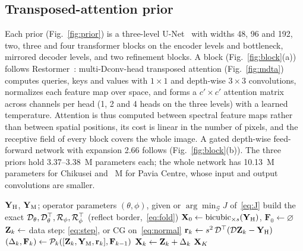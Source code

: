 \documentclass[journal]{IEEEtran}
\begin{document}
\subsection{Transposed-attention prior}
Each prior (Fig.~\ref{fig:prior}) is a three-level U-Net~\cite{ronneberger2015unet} with widths 48, 96 and 192, two, three and four transformer blocks on the encoder levels and bottleneck, mirrored decoder levels, and two refinement blocks. A block (Fig.~\ref{fig:block}(a)) follows Restormer~\cite{zamir2022restormer}: multi-Dconv-head transposed attention (Fig.~\ref{fig:mdta}) computes queries, keys and values with $1\times1$ and depth-wise $3\times3$ convolutions, normalizes each feature map over space, and forms a $c'\times c'$ attention matrix across channels per head (1, 2 and 4 heads on the three levels) with a learned temperature. Attention is thus computed between spectral feature maps rather than between spatial positions, its cost is linear in the number of pixels, and the receptive field of every block covers the whole image. A gated depth-wise feed-forward network with expansion 2.66 follows (Fig.~\ref{fig:block}(b)). The three priors hold 3.37--3.38~M parameters each; the whole network has 10.13~M parameters for Chikusei and ~M for Pavia Centre, whose input and output convolutions are smaller.

\begin{algorithm}[t]
\caption{ExactFuse inference (unrolled HQS)}
\label{alg:puformer}
\begin{algorithmic}[1]
\Require $\mathbf{Y}_{\mathrm{H}}$, $\mathbf{Y}_{\mathrm{M}}$; operator parameters $(\theta,\phi)$, given or $\arg\min_{\mathcal{G}}J$ of~\eqref{eq:J}
\State build the exact $\mathcal{D}_\theta,\mathcal{D}_\theta^{\top},\mathcal{R}_\phi,\mathcal{R}_\phi^{\top}$ (reflect border,~\eqref{eq:fold})
\State $\mathbf{X}_0\gets\mathrm{bicubic}_{\times s}(\mathbf{Y}_{\mathrm{H}})$, $\mathbf{F}_0\gets\varnothing$
  \State $\mathbf{Z}_k\gets$ data step: \eqref{eq:step}, or CG on~\eqref{eq:normal} 
  \State $\mathbf{r}_k\gets s^2\,\mathcal{D}^{\top}(\mathcal{D}\mathbf{Z}_k-\mathbf{Y}_{\mathrm{H}})$
  \State $(\Delta_k,\mathbf{F}_k)\gets\mathcal{P}_k([\mathbf{Z}_k,\mathbf{Y}_{\mathrm{M}},\mathbf{r}_k],\mathbf{F}_{k-1})$ 
  \State $\mathbf{X}_k\gets\mathbf{Z}_k+\Delta_k$
\EndFor
\State \Return $\mathbf{X}_K$
\end{algorithmic}
\end{algorithm}
\end{document}
